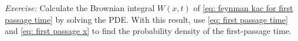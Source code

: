 \begin{framed}
    \textit{Exercise:}
    Calculate the Brownian integral $W(x, t)$ of \autoref{eq: feynman kac for first passage time} by solving the PDE.
    With this result, use \autoref{eq: first passage time} and \autoref{eq: first passage x} to find the probability density of the first-passage time.
\end{framed}

